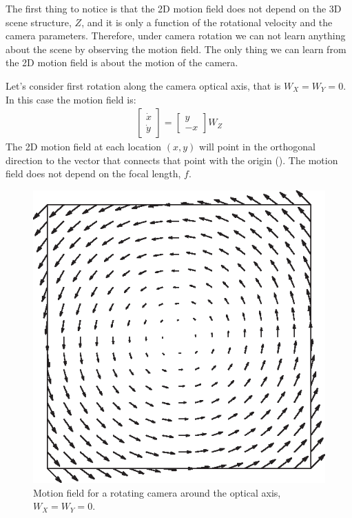The first thing to notice is that the 2D motion field does not depend on the 3D scene structure, $Z$, and it is only a function of the rotational velocity and the camera parameters. Therefore, under camera rotation we can not learn anything about the scene by observing the motion field. The only thing we can learn from the 2D motion field is about the motion of the camera.

Let's consider first rotation along the camera optical axis, that is $W_X=W_Y=0$. In this case the motion field is:
\begin{align}
    \begin{bmatrix}
        \dot{x} \\
        \dot{y}
    \end{bmatrix}
    =
    \begin{bmatrix}
        y \\
        -x
    \end{bmatrix}
    W_Z
\end{align}
The 2D motion field at each location $(x,y)$ will point in the orthogonal direction to the vector that connects that point with the origin (\fig{\ref{fig:motion_wz}}). The motion field does not depend on the focal length, $f$.

\begin{figure}[h!]
    \centerline{
        \includegraphics[width=.4\linewidth]{figures/optical_flow/motion_wz.eps}
    }
    \caption{Motion field for a rotating camera around the optical axis, $W_X=W_Y=0$.}
    \label{fig:motion_wz}
\end{figure}

